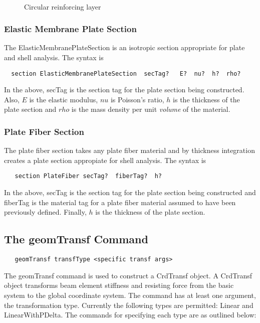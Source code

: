 \documentclass[12pt]{article}
\begin{document}
\begin{figure}[htpb]
\begin{center}
\leavevmode
\hbox{%
}
\end{center}
\caption{Circular reinforcing layer}
\label{circLayer}
\end{figure}


\subsubsection{Elastic Membrane Plate Section}
The ElasticMembranePlateSection
is an isotropic section appropriate for plate and shell analysis.
The syntax is
{\sf\small
\begin{verbatim}
  section ElasticMembranePlateSection  secTag?   E?  nu?  h?  rho?
\end{verbatim}
}
In the above, secTag is the section tag for the plate section 
being constructed. Also, 
$E$ is the elastic modulus, $nu$ is Poisson's ratio, 
$h$ is the thickness of the plate section and
$rho$ is the mass density per unit {\em volume} of the material.


\subsubsection{Plate Fiber Section}
The plate fiber section takes any plate fiber material and by 
thickness integration creates a plate section appropiate for shell analysis.
The syntax is
{\sf\small
\begin{verbatim}
   section PlateFiber secTag?  fiberTag?  h?
\end{verbatim}
}
In the above, secTag is the section tag for the plate section 
being constructed and fiberTag is the material tag for a plate
fiber material assumed to have been previously defined. Finally,
$h$ is the thickness of the plate section.


\subsection{The geomTransf Command}
{\sf\small
\begin{verbatim}
   geomTransf transfType <specific transf args>
\end{verbatim}
}

The geomTransf command is used to construct a CrdTransf object. A CrdTransf
object transforms beam element stiffness and resisting force from the 
basic system to the global coordinate system. The command has at least one 
argument, the transformation type. Currently the following types are 
permitted: Linear and LinearWithPDelta. The commands for specifying each 
type are as outlined below: 
\end{document}
